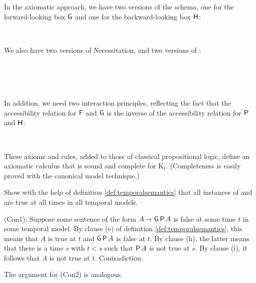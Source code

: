 In the axiomatic approach, we have two versions of the  schema, one for
the forward-looking box $\operatorname{\mathsf{G}}$ and one for the backward-looking box $\operatorname{\mathsf{H}}$:%
%
\begin{principles}
   \\
\end{principles}
%
We also have two versions of Necessitation, and two versions of :
%
\begin{principles}
  \\
  \\
  \\
\end{principles}
%
In addition, we need two interaction principles, reflecting the fact that the
accessibility relation for $\operatorname{\mathsf{F}}$ and $\operatorname{\mathsf{G}}$ is the inverse of the accessibility
relation for $\operatorname{\mathsf{P}}$ and $\operatorname{\mathsf{H}}$:
%
\begin{principles}
\\
\end{principles}

These axioms and rules, added to those of classical propositional logic, define
an axiomatic calculus that is sound and complete for K$_{t}$. (Completeness is
easily proved with the canonical model technique.)

\begin{exercise}
  Show with the help of definition \ref{def:temporalsemantics} that all
  instances of  and  are true at all times in all temporal
  models. %
\end{exercise}
\begin{solution}
  (Con1): Suppose some sentence of the form $A \to \tG\tP A$ is false at some time $t$ in some temporal model. By clause (e) of definition \ref{def:temporalsemantics}, this means that $A$ is true at $t$ and $\operatorname{\mathsf{G}}\operatorname{\mathsf{P}} A$ is false at $t$. By clause (h), the latter means that there is a time $s$ with $t<s$ such that $\operatorname{\mathsf{P}} A$ is not true at $s$. By clause (i), it follows that $A$ is not true at $t$. Contradiction.

  The argument for (Con2) is analogous.
\end{solution}


